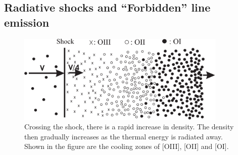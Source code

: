 \subsection{Radiative shocks and ``Forbidden'' line emission}

\begin{figure}[t]
\centering
\includegraphics[width=10cm]{redone_shock}
\caption{
Crossing the shock, there is a rapid increase in density. The density then gradually increases as the thermal energy is radiated away. Shown in the figure are the cooling zones of [OIII], [OII] and [OI].
}
\label{fig:RadShock} %
\end{figure}


